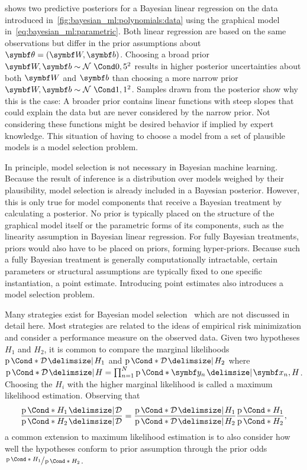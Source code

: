  shows two predictive posteriors for a Bayesian linear regression on the data introduced in~\cref{fig:bayesian_ml:polynomials:data} using the graphical model in~\cref{eq:bayesian_ml:parametric}.
Both linear regression are based on the same observations but differ in the prior assumptions about $\mat{\theta} = (\mat{W}, \mat{b})$.
Choosing a broad prior $\mat{W}, \mat{b} \sim \Gaussian{0, 5^2}$ results in higher posterior uncertainties about both $\mat{W}$ and $\mat{b}$ than choosing a more narrow prior $\mat{W}, \mat{b} \sim \Gaussian{1, 1^2}$.
Samples drawn from the posterior show why this is the case:
A broader prior contains linear functions with steep slopes that could explain the data but are never considered by the narrow prior.
Not considering these functions might be desired behavior if implied by expert knowledge.
This situation of having to choose a model from a set of plausible models is a model selection problem.

In principle, model selection is not necessary in Bayesian machine learning.
Because the result of inference is a distribution over models weighed by their plausibility, model selection is already included in a Bayesian posterior.
However, this is only true for model components that receive a Bayesian treatment by calculating a posterior.
No prior is typically placed on the structure of the graphical model itself or the parametric forms of its components, such as the linearity assumption in Bayesian linear regression.
For fully Bayesian treatments, priors would also have to be placed on priors, forming hyper-priors.
Because such a fully Bayesian treatment is generally computationally intractable, certain parameters or structural assumptions are typically fixed to one specific instantiation, a point estimate.
Introducing point estimates also introduces a model selection problem.

Many strategies exist for Bayesian model selection~\parencite{andrew_gelman_bayesian_2013,murphy_machine_2012,david_barber_bayesian_2012} which are not discussed in detail here.
Most strategies are related to the ideas of empirical risk minimization and consider a performance measure on the observed data.
Given two hypotheses $H_1$ and $H_2$, it is common to compare the marginal likelihoods $\Prob*{\Dc \given H_1}$ and $\Prob*{\Dc \given H_2}$ where $\Prob*{\Dc \given H} = \prod_{n=1}^N \Prob*{\mat{y}_n \given \mat{x}_n, H}$.
Choosing the $H_i$ with the higher marginal likelihood is called a maximum likelihood estimation.
Observing that
\begin{align}
\begin{split}
    \frac{\Prob*{H_1 \given \Dc}}{\Prob*{H_2 \given \Dc}} = \frac{\Prob*{\Dc \given H_1}}{\Prob*{\Dc \given H_2}} \frac{\Prob*{H_1}}{\Prob*{H_2}},
\end{split}
\end{align}
a common extension to maximum likelihood estimation is to also consider how well the hypotheses conform to prior assumption through the prior odds $\sfrac{\Prob*{H_1}}{\Prob*{H_2}}$.

